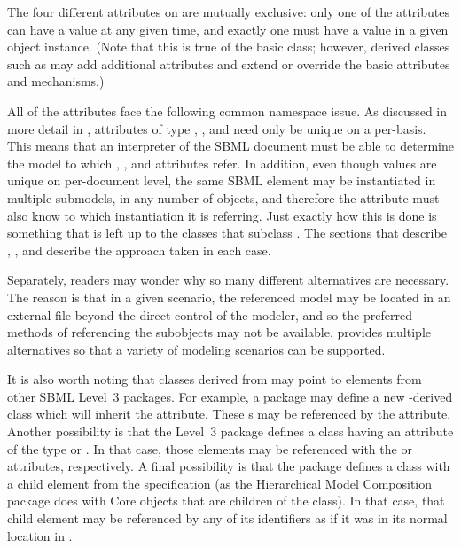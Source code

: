 The four different attributes on \SBaseRef are mutually exclusive: only one of the attributes can have a value at any given time, and exactly one must have a value in a given \SBaseRef object instance.  (Note that this is true of the basic \SBaseRef class; however, derived classes such as \ReplacedElement may add additional attributes and extend or override the basic attributes and mechanisms.)

All of the attributes face the following common namespace issue.  As discussed in more detail in , attributes of type , , and  need only be unique on a per-\Model basis.  This means that an interpreter of the SBML document must be able to determine the model to which , , and  attributes refer. In addition, even though  values are unique on per-document level, the same SBML element may be instantiated in multiple submodels, in any number of \Model objects, and therefore the  attribute must also know to which \Model instantiation it is referring. Just exactly how this is done is something that is left up to the classes that subclass \SBaseRef.  The sections that describe \Port, \Deletion, \ReplacedElement and \ReplacedBy describe the approach taken in each case.

Separately, readers may wonder why so many different alternatives are necessary.  The reason is that in a given scenario, the referenced model may be located in an external file beyond the direct control of the modeler, and so the preferred methods of referencing the subobjects may not be available.  \SBaseRef provides multiple alternatives so that a variety of modeling scenarios can be supported.

It is also worth noting that classes derived from \SBaseRef may point to elements from other SBML Level~3 packages.  For example, a package may define a new \SBase-derived class which will inherit the  attribute.  These s may be referenced by the \SBaseRef {} attribute.  Another possibility is that the Level~3 package defines a class having an attribute of the type  or .  In that case, those elements may be referenced with the  or  attributes, respectively.  A final possibility is that the package defines a class with a child element from the \sbmlthreecore specification (as the Hierarchical Model Composition package does with Core \Model objects that are children of the \ListOfModelDefinitions class).  In that case, that child element may be referenced by any of its identifiers as if it was in its normal location in \sbmlthreecore.

